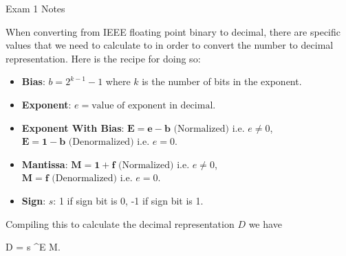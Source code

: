 \begin{examnotes}{Exam 1 Notes}
    \begin{highlight}
        When converting from IEEE floating point binary to decimal, there are specific values that we need to calculate to in order to convert the number to decimal representation. Here is the recipe 
        for doing so:

        \begin{itemize}
            \item \textbf{Bias}: $b = 2^{k - 1} - 1$ where $k$ is the number of bits in the exponent.
            \item \textbf{Exponent}: $e = \text{value of exponent in decimal}$.
            \item \textbf{Exponent With Bias}: $\mathbf{E = e - b} \text{ (Normalized) i.e. } e \neq 0$, $\mathbf{E = 1 - b} \text{ (Denormalized) i.e. } e = 0$.
            \item \textbf{Mantissa}: $\mathbf{M = 1 + f} \text{ (Normalized) i.e. } e \neq 0$, $\mathbf{M = f} \text{ (Denormalized) i.e. } e = 0$.
            \item \textbf{Sign}: $s$: 1 if sign bit is 0, -1 if sign bit is 1.
        \end{itemize}
        Compiling this to calculate the decimal representation $D$ we have

        \begin{center}
            \begin{highlightbox}
                D = s ^{E} \cdot M.
            \end{highlightbox}
        \end{center}
    \end{highlight}


\end{examnotes}
